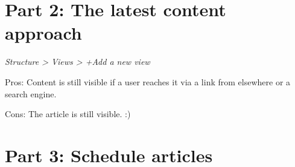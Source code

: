 \documentclass[letterpaper,10pt,english]{sphinxmanual}
\begin{document}
\section{Part 2: The latest content approach}
\label{schedule:part-2-the-latest-content-approach}
\emph{Structure \textgreater{} Views \textgreater{} +Add a new view}

Pros: Content is still visible if a user reaches it via a link from elsewhere or a search engine.

Cons: The article is still visible. :)


\section{Part 3: Schedule articles}
\label{schedule:part-3-schedule-articles}


\renewcommand{\indexname}{Index}
\printindex
\end{document}
